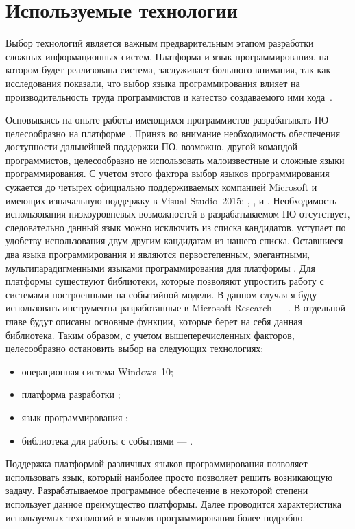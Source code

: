 \chapter{Используемые технологии}
\label{sec:practice:technology_used}

Выбор технологий является важным предварительным этапом разработки сложных информационных систем.
Платформа и язык программирования, на котором будет реализована система, заслуживает большого внимания, так как исследования показали, что выбор языка программирования влияет на производительность труда программистов и качество создаваемого ими кода~\cite[c.~59]{mcconnell_2005}.

Основываясь на опыте работы имеющихся программистов разрабатывать ПО целесообразно на платформе \dotnet{}.
Приняв во внимание необходимость обеспечения доступности дальнейшей поддержки ПО, возможно, другой командой программистов, целесообразно не использовать малоизвестные и сложные языки программирования.
С учетом этого фактора выбор языков программирования сужается до четырех официально поддерживаемых компанией Microsoft и имеющих изначальную поддержку в Visual Studio~2015: \cppcli{}, \csharp{}, \vbnet{} и \fsharp{}.
Необходимость использования низкоуровневых возможностей \cppcli{} в разрабатываемом ПО отсутствует, следовательно данный язык можно исключить из списка кандидатов.
\vbnet{} уступает по удобству использования двум другим кандидатам из нашего списка.
Оставшиеся два языка программирования \csharp{} и \fsharp{} являются первостепенным, элегантными, мультипарадигменными языками программирования для платформы \dotnet.
Для платформы \dotnet{} существуют библиотеки, которые позволяют упростить работу с системами построенными на событийной модели.
В данном случая я буду использовать инструменты разработанные в Microsoft Research --- \rx{}. В отдельной главе будут описаны основные функции, которые берет на себя данная библиотека.
Таким образом, с учетом вышеперечисленных факторов, целесообразно остановить выбор на следующих технологиях:
\begin{itemize}
  \item операционная система Windows~10;
  \item платформа разработки \dotnet{};
  \item язык программирования \csharp{};
  \item библиотека для работы с событиями --- \rx{}.
\end{itemize}
Поддержка платформой \dotnet{} различных языков программирования позволяет использовать язык, который наиболее просто позволяет решить возникающую задачу.
Разрабатываемое программное обеспечение в некоторой степени использует данное преимущество платформы.
Далее проводится характеристика используемых технологий и языков программирования более подробно.


